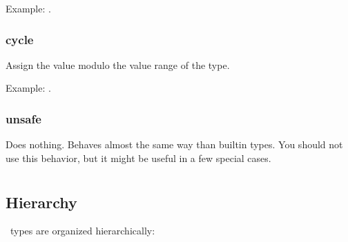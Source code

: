 Example: .

\subsubsection{cycle}

Assign the value modulo the value range of the type.

Example: .

\subsubsection{unsafe}

Does nothing. Behaves almost the same way than builtin types. You
should not use this behavior, but it might be useful in a few special
cases.




\section{}

\subsection{Hierarchy}

\integre\ types are organized hierarchically:


\subsection{}

\subsection{}

\subsection{}

